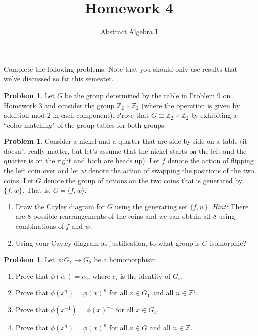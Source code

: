 \documentclass[11pt]{scrartcl}
\theoremstyle{definition}
\newtheorem{problem}[theorem]{Problem}
\begin{document}
\title{Homework 4}
\subtitle{Abstract Algebra I}
\date{}

\maketitle
\thispagestyle{fancy}

Complete the following problems. Note that you should only use results that we've discussed so far this semester.  

\begin{problem}
Let $G$ be the group determined by the table in Problem 9 on Homework 3 and consider the group $\mathbb{Z}_2\times \mathbb{Z}_2$ (where the operation is given by addition mod 2 in each component).  Prove that $G\cong \mathbb{Z}_2\times \mathbb{Z}_2$ by exhibiting a ``color-matching" of the group tables for both groups.
\end{problem}

\begin{problem}
Consider a nickel and a quarter that are side by side on a table (it doesn't really matter, but let's assume that the nickel starts on the left and the quarter is on the right and both are heads up).  Let $f$ denote the action of flipping the left coin over and let $w$ denote the action of swapping the positions of the two coins.  Let $G$ denote the group of actions on the two coins that is generated by $\{f,w\}$. That is, $G=\langle f,w\rangle$.
\begin{enumerate}[label=\rm{(\alph*)}]
\item Draw the Cayley diagram for $G$ using the generating set $\{f,w\}$. \emph{Hint:} There are 8 possible rearrangements of the coins and we can obtain all 8 using combinations of $f$ and $w$.
\item Using your Cayley diagram as justification, to what group is $G$ isomorphic?
\end{enumerate}
\end{problem}

\begin{problem}
Let $\phi:G_1\to G_2$ be a homomorphism.
\begin{enumerate}[label=\rm{(\alph*)}]
\item Prove that $\phi(e_1)=e_2$, where $e_i$ is the identity of $G_i$.
\item Prove that $\phi(x^n)=\phi(x)^n$ for all $x\in G_1$ and all $n\in\mathbb{Z}^+$.
\item Prove that $\phi(x^{-1})=\phi(x)^{-1}$ for all $x\in G_1$.
\item Prove that $\phi(x^n)=\phi(x)^n$ for all $x\in G$ and all $n\in\mathbb{Z}$.
\end{enumerate}
\end{problem}
\end{document}
